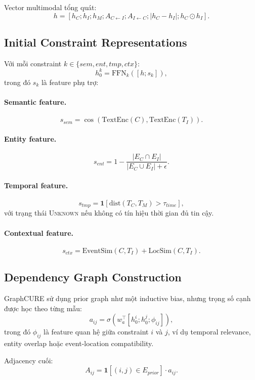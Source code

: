 \documentclass[11pt,a4paper]{article}
\newcommand{\Unk}{\textsc{Unknown}}
\begin{document}
Vector multimodal tổng quát:
\[
h = [h_C;h_I;h_M;A_{C \leftarrow I};A_{I \leftarrow C};|h_C-h_I|;h_C \odot h_I].
\]

\subsection{Initial Constraint Representations}

Với mỗi constraint $k \in \{sem,ent,tmp,ctx\}$:
\[
h^k_0 = \text{FFN}_k([h;s_k]),
\]
trong đó $s_k$ là feature phụ trợ:

\paragraph{Semantic feature.}
\[
s_{sem} = \cos(\text{TextEnc}(C),\text{TextEnc}(T_I)).
\]

\paragraph{Entity feature.}
\[
s_{ent} = 1 - \frac{|E_C \cap E_I|}{|E_C \cup E_I|+\epsilon}.
\]

\paragraph{Temporal feature.}
\[
s_{tmp} = \mathbf{1}[\text{dist}(T_C,T_M) > \tau_{time}],
\]
với trạng thái \Unk{} nếu không có tín hiệu thời gian đủ tin cậy.

\paragraph{Contextual feature.}
\[
s_{ctx} = \text{EventSim}(C,T_I) + \text{LocSim}(C,T_I).
\]

\subsection{Dependency Graph Construction}

GraphCURE sử dụng prior graph như một inductive bias, nhưng trọng số cạnh được học theo từng mẫu:
\[
a_{ij} = \sigma \left( w_a^\top [h^i_0;h^j_0;\phi_{ij}] \right),
\]
trong đó $\phi_{ij}$ là feature quan hệ giữa constraint $i$ và $j$, ví dụ temporal relevance, entity overlap hoặc event-location compatibility.

Adjacency cuối:
\[
A_{ij} = \mathbf{1}[(i,j)\in E_{prior}] \cdot a_{ij}.
\]
\end{document}
